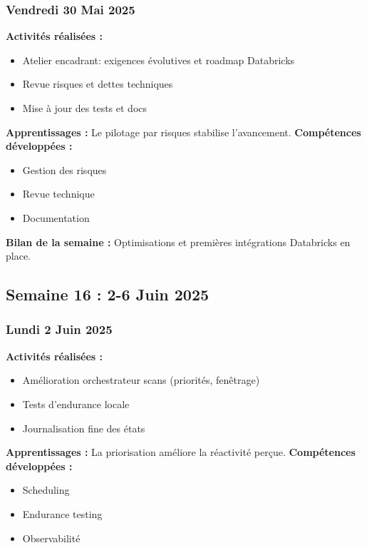 \documentclass[12pt,a4paper]{article}
\begin{document}
\subsubsection{Vendredi 30 Mai 2025}
\textbf{Activités réalisées :}
\begin{itemize}
    \item Atelier encadrant: exigences évolutives et roadmap Databricks
    \item Revue risques et dettes techniques
    \item Mise à jour des tests et docs
\end{itemize}
\textbf{Apprentissages :} Le pilotage par risques stabilise l'avancement.
\textbf{Compétences développées :}
\begin{itemize}
    \item Gestion des risques
    \item Revue technique
    \item Documentation
\end{itemize}
\textbf{Bilan de la semaine :} Optimisations et premières intégrations Databricks en place.

\clearpage
\subsection{Semaine 16 : 2-6 Juin 2025}

\subsubsection{Lundi 2 Juin 2025}
\textbf{Activités réalisées :}
\begin{itemize}
    \item Amélioration orchestrateur scans (priorités, fenêtrage)
    \item Tests d'endurance locale
    \item Journalisation fine des états
\end{itemize}
\textbf{Apprentissages :} La priorisation améliore la réactivité perçue.
\textbf{Compétences développées :}
\begin{itemize}
    \item Scheduling
    \item Endurance testing
    \item Observabilité
\end{itemize}
\end{document}

